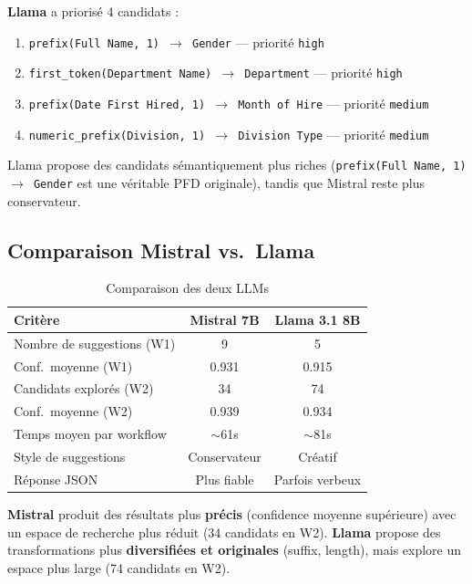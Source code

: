 \documentclass[12pt,a4paper]{article}
\begin{document}
\textbf{Llama} a prioris\'{e} 4 candidats :
\begin{enumerate}
    \item \texttt{prefix(Full Name, 1) $\rightarrow$ Gender} --- priorit\'{e} \texttt{high}
    \item \texttt{first\_token(Department Name) $\rightarrow$ Department} --- priorit\'{e} \texttt{high}
    \item \texttt{prefix(Date First Hired, 1) $\rightarrow$ Month of Hire} --- priorit\'{e} \texttt{medium}
    \item \texttt{numeric\_prefix(Division, 1) $\rightarrow$ Division Type} --- priorit\'{e} \texttt{medium}
\end{enumerate}

Llama propose des candidats s\'{e}mantiquement plus riches (\texttt{prefix(Full Name, 1) $\rightarrow$ Gender} est une v\'{e}ritable PFD originale), tandis que Mistral reste plus conservateur.

\subsection{Comparaison Mistral vs.\ Llama}

\begin{table}[H]
\centering
\caption{Comparaison des deux LLMs}
\label{tab:llm_comparison}
\begin{tabular}{@{}lcc@{}}
\toprule
\textbf{Crit\`{e}re} & \textbf{Mistral 7B} & \textbf{Llama 3.1 8B} \\
\midrule
Nombre de suggestions (W1) & 9 & 5 \\
Conf.\ moyenne (W1) & 0.931 & 0.915 \\
Candidats explor\'{e}s (W2) & 34 & 74 \\
Conf.\ moyenne (W2) & 0.939 & 0.934 \\
Temps moyen par workflow & $\sim$61s & $\sim$81s \\
Style de suggestions & Conservateur & Cr\'{e}atif \\
R\'{e}ponse JSON & Plus fiable & Parfois verbeux \\
\bottomrule
\end{tabular}
\end{table}

\textbf{Mistral} produit des r\'{e}sultats plus \textbf{pr\'{e}cis} (confidence moyenne sup\'{e}rieure) avec un espace de recherche plus r\'{e}duit (34 candidats en W2). \textbf{Llama} propose des transformations plus \textbf{diversifi\'{e}es et originales} (suffix, length), mais explore un espace plus large (74 candidats en W2).
\end{document}

